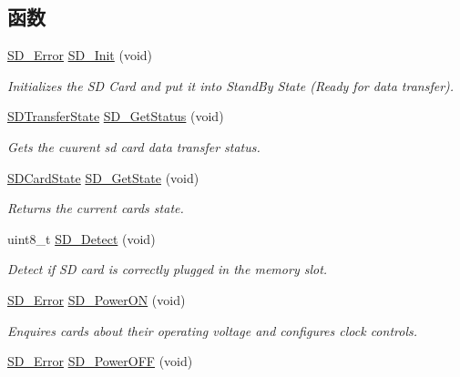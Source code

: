 \subsection*{函数}
\begin{DoxyCompactItemize}
\item 
\hyperlink{group__sd__card_gacff91fa68daa1d1ee967b5b3fb3dbd8c}{S\+D\+\_\+\+Error} \hyperlink{group__sd__card_ga3c927d4d98ffb6f3cc2442b09c19926c}{S\+D\+\_\+\+Init} (void)
\begin{DoxyCompactList}\small\item\em Initializes the SD Card and put it into Stand\+By State (Ready for data transfer). \end{DoxyCompactList}\item 
\hyperlink{group__sd__card_gace0484a459648257c3eae8ea60f64fbf}{S\+D\+Transfer\+State} \hyperlink{group__sd__card_gaf3f228aaee7b2b18acc056b2f27ca3f7}{S\+D\+\_\+\+Get\+Status} (void)
\begin{DoxyCompactList}\small\item\em Gets the cuurent sd card data transfer status. \end{DoxyCompactList}\item 
\hyperlink{group__sd__card_gacdc2533a9bff7dc10def0945f5915398}{S\+D\+Card\+State} \hyperlink{group__sd__card_ga1c49d266e4f9ba33b7a425361a30d227}{S\+D\+\_\+\+Get\+State} (void)
\begin{DoxyCompactList}\small\item\em Returns the current card\textquotesingle{}s state. \end{DoxyCompactList}\item 
uint8\+\_\+t \hyperlink{group__sd__card_gacb7415873dffa26068c5e46025efebfa}{S\+D\+\_\+\+Detect} (void)
\begin{DoxyCompactList}\small\item\em Detect if SD card is correctly plugged in the memory slot. \end{DoxyCompactList}\item 
\hyperlink{group__sd__card_gacff91fa68daa1d1ee967b5b3fb3dbd8c}{S\+D\+\_\+\+Error} \hyperlink{group__sd__card_ga9fbd4dd6187701cbe286ddb163e9c312}{S\+D\+\_\+\+Power\+ON} (void)
\begin{DoxyCompactList}\small\item\em Enquires cards about their operating voltage and configures clock controls. \end{DoxyCompactList}\item 
\hyperlink{group__sd__card_gacff91fa68daa1d1ee967b5b3fb3dbd8c}{S\+D\+\_\+\+Error} \hyperlink{group__sd__card_ga9f053c27018521095d7333e7df238764}{S\+D\+\_\+\+Power\+O\+FF} (void)

\end{DoxyCompactItemize}
